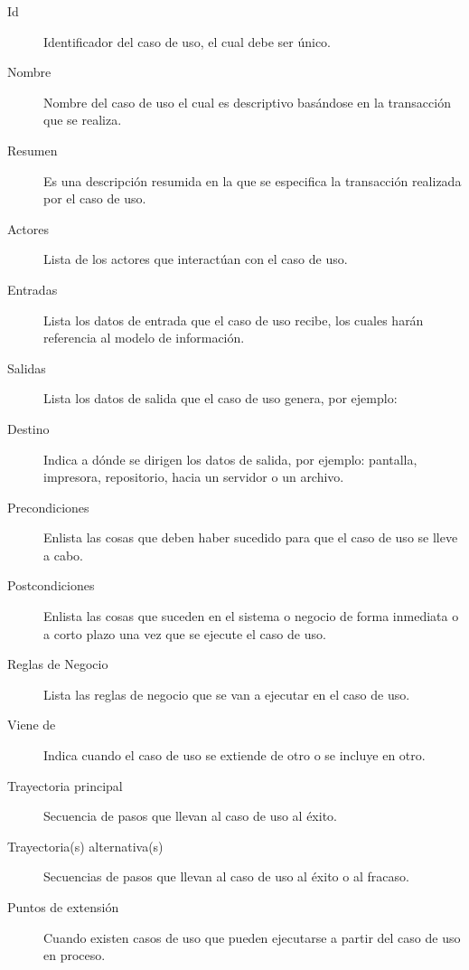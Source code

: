 \begin{description}
	\item[Id] Identificador del caso de uso, el cual debe ser único.
	\item[Nombre] Nombre del caso de uso el cual es descriptivo basándose en la transacción que se realiza.
	\item[Resumen] Es una descripción resumida en la que se especifica la transacción realizada por el caso de uso.
	\item[Actores] Lista de los actores que interactúan con el caso de uso.
	\item[Entradas] Lista los datos de entrada que el caso de uso recibe, los cuales harán referencia al modelo de información.
	\item[Salidas] Lista los datos de salida que el caso de uso genera, por ejemplo: 
	\item[Destino] Indica a dónde se dirigen los datos de salida, por ejemplo: pantalla, impresora, repositorio, hacia un servidor o un archivo.
	\item[Precondiciones] Enlista las cosas que deben haber sucedido para que el caso  de uso se lleve a cabo.
	\item[Postcondiciones] Enlista las cosas que suceden en el sistema o negocio de forma inmediata o a corto plazo una vez que se ejecute el caso de uso.
	\item[Reglas de Negocio] Lista las reglas de negocio que se van a ejecutar en el caso de uso.
	\item[Viene de] Indica cuando el caso de uso se extiende de otro o se incluye en otro.
	\item[Trayectoria principal] Secuencia de pasos que llevan al caso de uso al éxito.
	\item[Trayectoria(s) alternativa(s)] Secuencias de pasos que llevan al caso de uso al éxito o al fracaso.
	\item[Puntos de extensión] Cuando existen casos de uso que pueden ejecutarse a partir del caso de uso en proceso.
\end{description}












